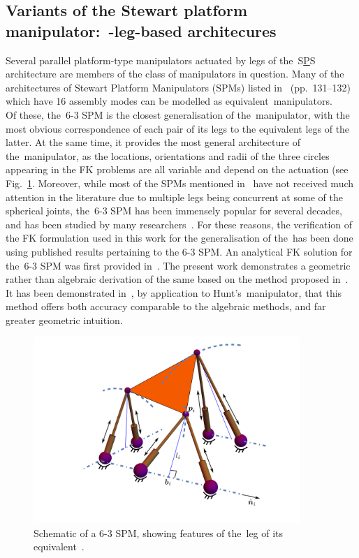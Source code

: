 \documentclass[DD]{iitmdiss}
\newcommand{\mref}[1]{\ref{#1}}
\newcommand{\mcite}[1]{\cite{#1}}
\newcommand{\mlabel}[1]{\label{#1}}
\begin{document}
\subsection{Variants of the Stewart platform manipulator:~\sps-leg-based architecures}\mlabel{sc:spstypes}
%
Several parallel platform-type manipulators actuated by legs of the~S\underline{P}S architecture are members of the class of manipulators in question. Many of the architectures of Stewart Platform Manipulators (SPMs) listed in~\mcite{merletbook} (pp.~131--132) which have 16 assembly modes can be modelled as equivalent~\rps manipulators. \\
Of these, the~6-3 SPM is the closest generalisation of the~\rps manipulator, with the most obvious correspondence of each pair of its legs to the equivalent legs of the latter. At the same time, it provides the most general architecture of the~\rps manipulator, as the locations, orientations and radii of the three circles appearing in the FK problems are all variable and depend on the actuation (see Fig.~\mref{fg:spm63}. Moreover, while most of the SPMs mentioned in~\mcite{merletbook} have not received much attention in the literature due to multiple legs being concurrent at some of the spherical joints, the~6-3 SPM has been immensely popular for several decades, and has been studied by many researchers~\mcite{dasgupta2000}. For these reasons, the verification of the FK formulation used in this work for the generalisation of the~\rps has been done using published results pertaining to the 6-3 SPM. An analytical FK solution for the~6-3 SPM was first provided in~\mcite{innocenti1990}. The present work demonstrates a geometric rather than algebraic derivation of the same based on the method proposed in~\mcite{tk2017a}. It has been demonstrated in~\mcite{tk2017b}, by application to Hunt's~\rps manipulator, that this method offers both accuracy comparable to the algebraic methods, and far greater geometric intuition. 
\begin{figure}[h]
	\centering
	\includegraphics[width=0.9\textwidth]{spm63.png}
	\caption{Schematic of a 6-3 SPM, showing features of the~\ith leg of its equivalent~\rps.}
	\mlabel{fg:spm63}
\end{figure}
%
\end{document}
